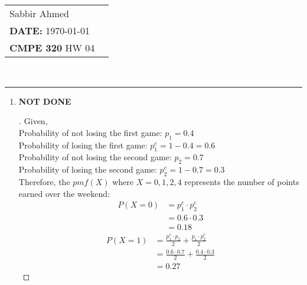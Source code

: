 \documentclass[paper=usletter, fontsize=12pt]{article}
\newcommand{\documentinfo}[5]{
    \begin{centering}
        \parbox{2in}{
        \begin{spacing}{1}
            \begin{flushleft}
                \begin{tabular}{l l}
                    #1 \\
                    #2 \\
                    #3 \\
                \end{tabular}\\
                \rule{\textwidth}{1pt}
            \end{flushleft}
        \end{spacing}
        }
    \end{centering}
}
\begin{document}
    \documentinfo{Sabbir Ahmed}{\textbf{DATE:} \today}{\textbf{CMPE 320} HW 04}
    \vspace{-0.2in}

    \begin{enumerate}

        \item
        \textbf{NOT DONE}
        \begin{proof}[\unskip\nopunct]
            Given,\\
            Probability of not losing the first game: $p_1=0.4$\\
            Probability of losing the first game: $p_1^c=1-0.4=0.6$\\
            Probability of not losing the second game: $p_2=0.7$\\
            Probability of losing the second game: $p_2^c=1-0.7=0.3$\\

            Therefore, the $pmf(X)$ where $X=0,1,2,4$ represents the number of
            points earned over the weekend:
            \begin{align*}
                P(X=0) & = p_1^c \cdot p_2^c\\
                & = 0.6 \cdot 0.3\\
                & = 0.18
            \end{align*}
            \begingroup
            \addtolength{\jot}{1em}
            \begin{align*}
                P(X=1) & = \frac{p_1^c \cdot p_2}{2} + \frac{p_1 \cdot
                p_2^c}{2}\\
                & = \frac{0.6 \cdot 0.7}{2} + \frac{0.4 \cdot 0.3}{2}\\
                & = 0.27
            \end{align*}
            \endgroup
        \end{proof}
        \vspace{0.2in}


\end{enumerate}
\end{document}
